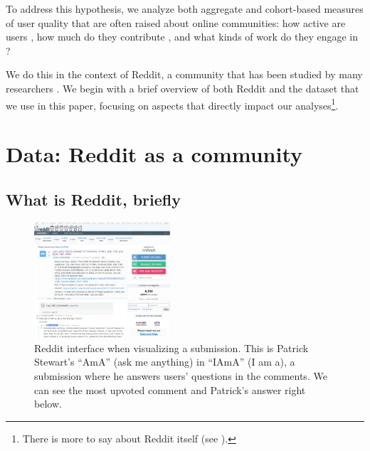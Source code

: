 To address this hypothesis, we analyze both aggregate and cohort-based measures of user quality that are often raised about online communities: how active are users \cite{Scellato2011,Hughes2009,Java2007,Levy1984}, how much do they contribute \cite{Scellato2011,Gruhl2004,Guo2009}, and what kinds of work do they engage in \cite{Welser2011,Choi2010,Panciera2009}?  

We do this in the context of Reddit, a community that has been studied by many researchers \cite{Gilbert2013,Stoddard2015,Bergstrom2011,Tan2015}. We begin with a brief overview of both Reddit and the dataset that we use in this paper, focusing on aspects that directly impact our analyses\footnote{There is more to say about Reddit itself (see \cite{AboutReddit}).}.

\section{Data: Reddit as a community}


\subsection{What is Reddit, briefly}

\begin{figure}[!tb]
\centering
\includegraphics[width=0.45\textwidth,natwidth=964,natheight=823]{./images/reddit.png}
\caption{Reddit interface when visualizing a submission. This is Patrick Stewart's ``AmA'' (ask me anything) in ``IAmA'' (I am a), a submission where he answers users' questions in the comments. We can see the most upvoted comment and Patrick's answer right below.}
\label{fig:reddit}
\end{figure}

